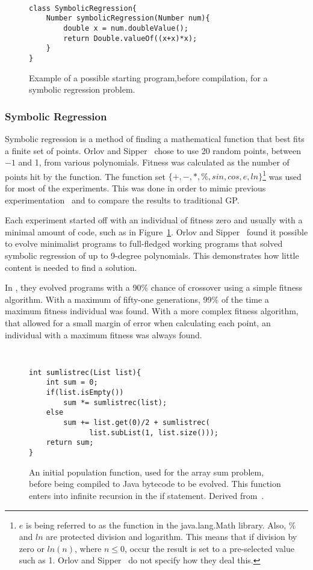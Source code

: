 \documentclass{sig-alternate}
\begin{document}
\begin{figure}
\centering
{\tt
\begin{verbatim}
class SymbolicRegression{
    Number symbolicRegression(Number num){
        double x = num.doubleValue();
        return Double.valueOf((x+x)*x);
    }
}
\end{verbatim}
}
\caption{Example of a possible starting program,before compilation, for a symbolic regression problem.}
\label{regression}
\end{figure}
\subsubsection{Symbolic Regression}
Symbolic regression is a method of finding a mathematical function that best fits a finite set of points. Orlov and Sipper~\cite{FINCH:2011} chose to use 20 random points, between ${-1}$ and 1, from various polynomials. Fitness was calculated as the number of points hit by the function. The function set ${\{+, -, *, \%, sin, cos, e, ln\}}$\footnote{$e$ is being referred to as the function in the java.lang.Math library. Also, $\%$ and $ln$ are protected division and logarithm. This means that if division by zero or $ln(n)$, where $n \le 0$, occur the result is set to a pre-selected value such as 1. Orlov and Sipper~\cite{FINCH:2011} do not specify how they deal this.} was used for most of the experiments. This was done in order to mimic previous experimentation~\cite{koza:1992} and to compare the results to traditional GP.

Each experiment started off with an individual of fitness zero and usually with a minimal amount of code, such as in Figure~\ref{regression}. Orlov and Sipper~\cite{FINCH:2011} found it possible  to evolve minimalist programs to full-fledged working programs that solved symbolic regression of up to 9-degree polynomials. This demonstrates how little content is needed to find a solution.\par

In \cite{FINCH:2011}, they evolved programs with a 90\% chance of crossover using a simple fitness algorithm. With a maximum of fifty-one generations, 99\% of the time a maximum fitness individual was found. With a more complex fitness algorithm, that allowed for a small margin of error when calculating each point, an individual with a maximum fitness was always found. 

\begin{figure}
\centering
{\tt
\begin{verbatim}
int sumlistrec(List list){
    int sum = 0;
    if(list.isEmpty())
        sum *= sumlistrec(list);
    else
        sum += list.get(0)/2 + sumlistrec(
              list.subList(1, list.size()));
    return sum;
}
\end{verbatim}
}

\caption{An initial population function, used for the array sum problem, before being compiled to Java bytecode to be evolved. This function enters into infinite recursion in the if statement. Derived from~\cite{FINCH:2011}.}
\label{initial rec}
\end{figure}
\end{document}
